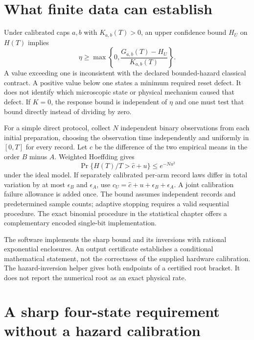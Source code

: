 \section{What finite data can establish}

Under calibrated caps $a,b$ with $K_{a,b}(T)>0$, an upper confidence bound $H_U$
on $H(T)$ implies
\begin{equation}
 \eta\geq\max\left\{0,
       \frac{G_{a,b}(T)-H_U}{K_{a,b}(T)}\right\}.
 \label{rr:defect-inverse}
\end{equation}
A value exceeding one is inconsistent with the declared bounded-hazard
classical contract. A positive value below one states a minimum required reset
defect. It does not identify which microscopic state or physical mechanism
caused that defect. If $K=0$, the response bound is independent of $\eta$ and
one must test that bound directly instead of dividing by zero.

For a simple direct protocol, collect $N$ independent binary observations from
each initial preparation, choosing the observation time independently and
uniformly in $[0,T]$ for every record. Let $\widehat c$ be the difference of the
two empirical means in the order $B$ minus $A$. Weighted Hoeffding gives
\[
 \Pr\{H(T)/T>\widehat c+u\}\leq e^{-Nu^2}
\]
under the ideal model. If separately calibrated per-arm record laws differ in
total variation by at most $\epsilon_B$ and $\epsilon_A$, use
$c_U=\widehat c+u+\epsilon_B+\epsilon_A$. A joint calibration failure allowance
is added once. The bound assumes independent records and predetermined sample
counts; adaptive stopping requires a valid sequential procedure. The exact
binomial procedure in the statistical chapter offers a complementary encoded
single-bit implementation.

The software implements the sharp bound and its inversions with rational
exponential enclosures. An output certificate establishes a conditional
mathematical statement, not the correctness of the supplied hardware
calibration. The hazard-inversion helper gives both endpoints of a certified
root bracket. It does not report the numerical root as an exact physical rate.

\section{A sharp four-state requirement without a hazard calibration}
\label{rr:four-states}

